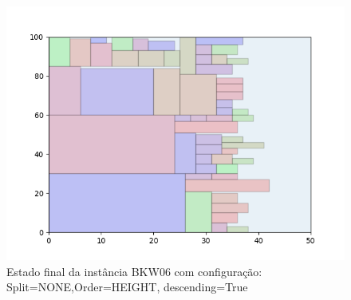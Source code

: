 \begin{figure}[H]
    \centering
    \caption[]{Estado final da instância BKW06 com configuração: Split=NONE,Order=HEIGHT, descending=True}
    \label{fig:bkw06-none-height-true}
    \includegraphics[scale=0.5]{output/figures/bkw/bkw06/none/height/true/00}
\end{figure}